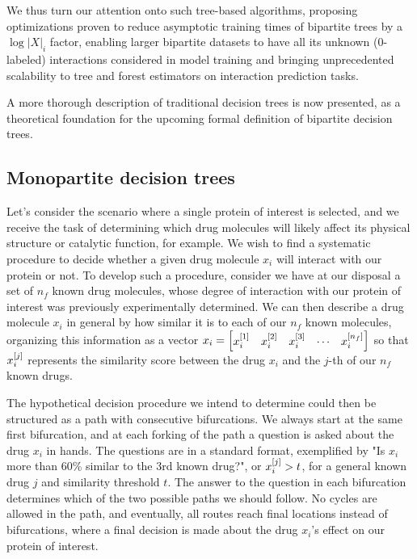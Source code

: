 We thus turn our attention onto such tree-based algorithms, proposing optimizations proven to reduce asymptotic training times of bipartite trees by a $\log |X|_i$ factor, enabling larger bipartite datasets to have all its unknown (0-labeled) interactions considered in model training and bringing unprecedented scalability to tree and forest estimators on interaction prediction tasks.


A more thorough description of traditional decision trees is now presented, as a theoretical foundation for the upcoming formal definition of bipartite decision trees.


\subsection{Monopartite decision trees}
\label{sec:dt}

Let's consider the scenario where a single protein of interest is selected, and we receive the task of determining which drug molecules will likely affect its physical structure or catalytic function, for example. We wish to find a systematic procedure to decide whether a given drug molecule $x_i$ will interact with our protein or not. To develop such a procedure, consider we have at our disposal a set of $n_f$ known drug molecules, whose degree of interaction with our protein of interest was previously experimentally determined. We can then describe a drug molecule $x_i$ in general by how similar it is to each of our $n_f$ known molecules, organizing this information as a vector $x_i = \begin{bmatrix}x_i^{[1]} & x_i^{[2]} & x_i^{[3]} & \cdots & x_i^{[n_f]}\end{bmatrix}$ so that $x_i^{[j]}$ represents the similarity score between the drug $x_i$ and the $j$-th of our $n_f$ known drugs.

The hypothetical decision procedure we intend to determine could then be structured as a path with consecutive bifurcations. We always start at the same first bifurcation, and at each forking of the path a question is asked about the drug $x_i$ in hands. The questions are in a standard format, exemplified by "Is $x_i$ more than 60\% similar to the 3rd known drug?", or $x_i^{[j]} > t$, for a general known drug $j$ and similarity threshold $t$. The answer to the question in each bifurcation determines which of the two possible paths we should follow. No cycles are allowed in the path, and eventually, all routes reach final locations instead of bifurcations, where a final decision is made about the drug $x_i$'s effect on our protein of interest.

